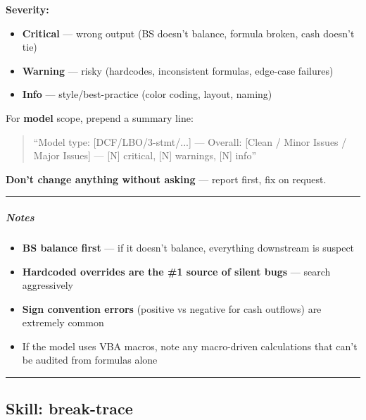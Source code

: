 \documentclass[11pt]{article}
\begin{document}
\textbf{Severity:}

\begin{itemize}[leftmargin=*,itemsep=2pt,topsep=2pt]
\item {} \textbf{Critical} — wrong output (BS doesn't balance, formula broken, cash doesn't tie)
\item {} \textbf{Warning} — risky (hardcodes, inconsistent formulas, edge-case failures)
\item {} \textbf{Info} — style/best-practice (color coding, layout, naming)
\end{itemize}

For \textbf{model} scope, prepend a summary line:


\begin{quote}
``Model type: [DCF/LBO/3-stmt/...] — Overall: [Clean / Minor Issues / Major Issues] — [N] critical, [N] warnings, [N] info''
\end{quote}

\textbf{Don't change anything without asking} — report first, fix on request.


\vspace{0.5em}\hrule\vspace{0.5em}

\subparagraph{Notes}\mbox{}\par

\begin{itemize}[leftmargin=*,itemsep=2pt,topsep=2pt]
\item {} \textbf{BS balance first} — if it doesn't balance, everything downstream is suspect
\item {} \textbf{Hardcoded overrides are the \#1 source of silent bugs} — search aggressively
\item {} \textbf{Sign convention errors} (positive vs negative for cash outflows) are extremely common
\item {} If the model uses VBA macros, note any macro-driven calculations that can't be audited from formulas alone
\end{itemize}

\vspace{0.8em}\hrule\vspace{0.8em}

\subsection{Skill: break-trace}\label{file:gl-reconciler-skills-break-trace-SKILL-md}
\end{document}
